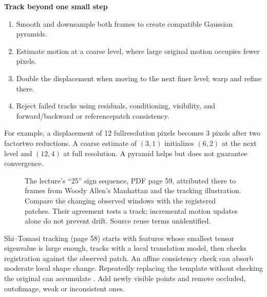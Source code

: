 \documentclass[letterpaper,11pt,english,openany,oneside]{jupyterBook}
\begin{document}
\begin{TextbookBox}
\textbf{Track beyond one small step}\par\smallskip
\begin{enumerate}
%
\item {}
\sphinxAtStartPar
Smooth and downsample both frames to create compatible Gaussian pyramids.

\item {}
\sphinxAtStartPar
Estimate motion at a coarse level, where large original motion occupies fewer pixels.

\item {}
\sphinxAtStartPar
Double the displacement when moving to the next finer level; warp and refine there.

\item {}
\sphinxAtStartPar
Reject failed tracks using residuals, conditioning, visibility, and forward/backward or reference\sphinxhyphen{}patch consistency.

\end{enumerate}

\sphinxAtStartPar
For example, a displacement of 12 full\sphinxhyphen{}resolution pixels becomes 3 pixels after two factor\sphinxhyphen{}two reductions. A coarse estimate of \((3,1)\) initializes \((6,2)\) at the next level and \((12,4)\) at full resolution. A pyramid helps but does not guarantee convergence.

\end{TextbookBox}

\begin{figure}[H]
\centering
\capstart

\noindent{}
\caption{The lecture’s “25” sign sequence, PDF page 59, attributed there to frames from Woody Allen’s Manhattan and the tracking illustration. Compare the changing observed windows with the registered patches. Their agreement tests a track; incremental motion updates alone do not prevent drift. Source reuse terms unidentified.}\label{\detokenize{lectures/lecture05/tracking:fig-lec05-sign}}\end{figure}

\sphinxAtStartPar
Shi–Tomasi tracking (page 58) starts with features whose smallest tensor eigenvalue is large enough, tracks with a local translation model, then checks registration against the  observed patch. An affine consistency check can absorb moderate local shape change. Repeatedly replacing the template without checking the original can accumulate . Add newly visible points and remove occluded, out\sphinxhyphen{}of\sphinxhyphen{}image, weak or inconsistent ones.
\end{document}
